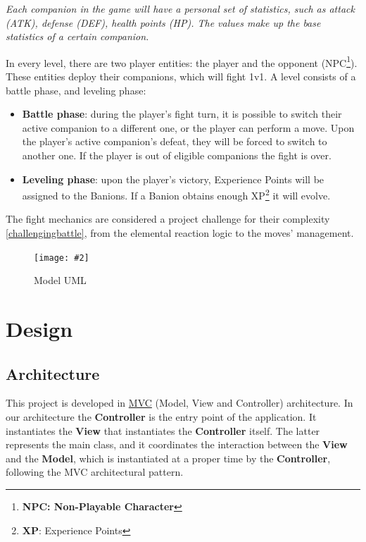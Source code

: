 \documentclass[12pt, a4paper]{report}
\newcommand*{\MyIncludeGraphics}[2][]{%
\begin{adjustbox}{max size={\textwidth}{\textheight}}
    \texttt{[image: \#2]}%
\end{adjustbox}
}
\theoremstyle{definition}
\begin{document}
    \textit{Each companion in the game will have a personal set of statistics, such as attack (ATK), defense (DEF), health points (HP).
    The values make up the base statistics of a certain companion.}

    In every level, there are two player entities: the player and the opponent (NPC\footnote{\textbf{NPC: Non-Playable Character}}). These entities deploy their companions, which will fight 1v1.
    A level consists of a battle phase, and leveling phase:
\begin{itemize}
    \item \textbf{Battle phase}: during the player's fight turn, it is possible to switch their active companion to a different one, 
        or the player can perform a move. Upon the player's active companion's defeat, they will be forced to switch to another one. 
        If the player is out of eligible companions the fight is over.
    \item \textbf{Leveling phase}: upon the player's victory, Experience Points will be assigned to the Banions. If a Banion obtains enough XP\footnote{\textbf{XP}: Experience Points} it will evolve.
\end{itemize}

    The fight mechanics are considered a project challenge for their complexity \ref{challengingbattle}, from the elemental reaction logic to the moves' management.

    \begin{figure}[H]
    \centering{}
    \caption{Model UML}
    \MyIncludeGraphics{model}
    \end{figure}

\chapter{Design}

\section{Architecture}

    This project is developed in \href{https://en.wikipedia.org/wiki/Model%E2%80%93view%E2%80%93controller}{MVC} (Model, View and Controller) architecture.
    In our architecture the \textbf{Controller} is the entry point of the application. It instantiates the \textbf{View} that instantiates the \textbf{Controller} itself.
    The latter represents the main class, and it coordinates the interaction between the \textbf{View} and the \textbf{Model}, which is instantiated at a proper time by
    the \textbf{Controller}, following the MVC architectural pattern.
\end{document}
